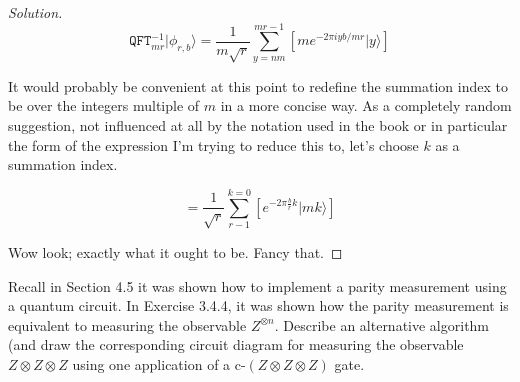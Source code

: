 \documentclass[12pt]{article}
\newenvironment{problem}[2][Problem]{\begin{trivlist}
\item[\hskip \labelsep {\bfseries #1}\hskip \labelsep {\bfseries #2.}]}{\end{trivlist}}
\begin{document}
\begin{proof}[Solution]
$$\texttt{QFT}_{mr}^{-1}|\phi_{r,b}\rangle=\frac{1}{m\sqrt{r}}\sum_{y=nm}^{mr-1}\left[me^{-2\pi iyb/mr}|y\rangle\right]$$

It would probably be convenient at this point to redefine the summation index to be over the integers multiple of $m$ in a more concise way. As a completely random suggestion, not influenced at all by the notation used in the book or in particular the form of the expression I'm trying to reduce this to, let's choose $k$ as a summation index.

$$=\frac{1}{\sqrt{r}}\sum_{r-1}^{k=0}\left[e^{-2\pi\frac{b}{r}k}|mk\rangle\right]$$

Wow look; exactly what it ought to be. Fancy that.

\end{proof}

\newpage

\begin{problem}{7.2.2a}
Recall in Section 4.5 it was shown how to implement a parity measurement using a quantum circuit. In Exercise 3.4.4, it was shown how
the parity measurement is equivalent to measuring the observable $Z^{\otimes n}$. Describe an alternative algorithm (and draw the
corresponding circuit diagram for measuring the observable$Z\otimes Z\otimes Z$ using one application of a c-$(Z\otimes Z\otimes Z)$
gate.
\end{problem}
\end{document}

